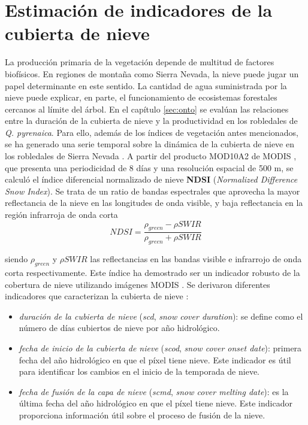 \section{Estimación de indicadores de la cubierta de nieve}\label{sec:metodologia:modis-nieve}
La producción primaria de la vegetación depende de multitud de factores biofísicos. En regiones de montaña como Sierra Nevada, la nieve puede jugar un papel determinante en este sentido. La cantidad de agua suministrada por la nieve puede explicar, en parte, el funcionamiento de ecosistemas forestales cercanos al límite del árbol. En el capítulo \ref{sec:onto} se evalúan las relaciones entre la duración de la cubierta de nieve y la productividad en los robledales de \emph{Q. pyrenaica}. Para ello, además de los índices de vegetación antes mencionados, se ha generado una serie temporal sobre la dinámica de la cubierta de nieve en
los robledales de Sierra Nevada \autocites{PerezLuqueetal2016TemporalTrend,BonetGarciaetal2015AnalisisTendencias}. A partir del producto MOD10A2 de MODIS \autocites{Halletal2002MODISSnowcover}, que presenta una periodicidad de 8 días y una resolución espacial de 500 m, se calculó el índice diferencial normalizado de nieve \textbf{NDSI} (\emph{Normalized Difference Snow Index}). Se trata de un ratio de bandas espectrales que aprovecha la mayor reflectancia de la nieve en las longitudes de onda visible, y baja reflectancia en la región infrarroja de onda corta
\autocites{SalomonsonAppel2006DevelopmentAqua} \[NDSI = \frac{\rho_{green} - \rho{SWIR}}{\rho_{green} + \rho{SWIR}}\]

siendo \(\rho_{green}\) y \(\rho{SWIR}\) las reflectancias en las bandas visible e infrarrojo de onda corta respectivamente. Este índice ha demostrado ser un indicador robusto de la cobertura de nieve utilizando
imágenes MODIS \autocites{Rittgeretal2013AssessmentMethods}. Se derivaron diferentes indicadores que caracterizan la cubierta de nieve \autocites{WangXie2009NewMethods}: 

\begin{itemize}
\item \emph{duración de la cubierta de
nieve} (\emph{scd}, \emph{snow cover duration}): se define como el número de días cubiertos de nieve por año hidrológico.
\item \emph{fecha de inicio de la cubierta de nieve} (\emph{scod}, \emph{snow cover onset date}): primera fecha del año hidrológico en que el píxel tiene nieve. Este indicador es útil para identificar los cambios en el inicio de la temporada de nieve.
\item \emph{fecha de fusión de la capa de nieve} (\emph{scmd}, \emph{snow cover melting date}): es la última fecha del año hidrológico en que el píxel tiene nieve. Este indicador proporciona información útil sobre el proceso de fusión de la nieve.
\end{itemize} 

